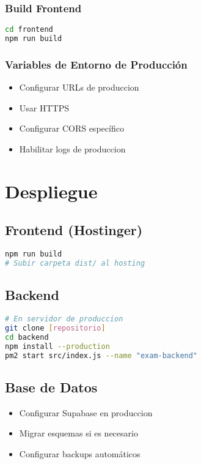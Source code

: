 \documentclass[12pt,a4paper]{report}
\begin{document}
\subsection{Build Frontend}
\begin{lstlisting}[language=bash]
cd frontend
npm run build
\end{lstlisting}

\subsection{Variables de Entorno de Producción}
\begin{itemize}
    \item Configurar URLs de produccion
    \item Usar HTTPS
    \item Configurar CORS específico
    \item Habilitar logs de produccion
\end{itemize}

\chapter{Despliegue}

\section{Frontend (Hostinger)}
\begin{lstlisting}[language=bash]
npm run build
# Subir carpeta dist/ al hosting
\end{lstlisting}

\section{Backend}
\begin{lstlisting}[language=bash]
# En servidor de produccion
git clone [repositorio]
cd backend
npm install --production
pm2 start src/index.js --name "exam-backend"
\end{lstlisting}

\section{Base de Datos}
\begin{itemize}
    \item Configurar Supabase en produccion
    \item Migrar esquemas si es necesario
    \item Configurar backups automáticos
\end{itemize}
\end{document}
